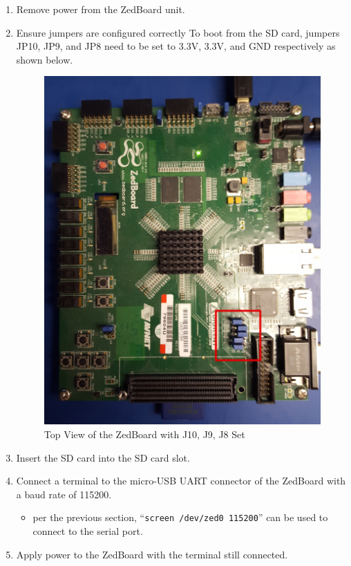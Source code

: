 \begin{enumerate}
\item Remove power from the ZedBoard unit.
\item Ensure jumpers are configured correctly
\subitem To boot from the SD card, jumpers JP10, JP9, and JP8 need to be set to 3.3V, 3.3V, and GND respectively as shown below.
\begin{figure}[ht]
	\centerline{\includegraphics[scale=0.15]{zed_top}}
	\caption{Top View of the ZedBoard with J10, J9, J8 Set}
	\label{fig:zed_top}
\end{figure}
\item Insert the SD card into the SD card slot.
\item Connect a terminal to the micro-USB UART connector of the ZedBoard with a baud rate of 115200.
\begin{itemize}
\item per the previous section, ``\texttt{screen /dev/zed0 115200}'' can be used to connect to the serial port.
\end{itemize}
\item Apply power to the ZedBoard with the terminal still connected.
\end{enumerate}


